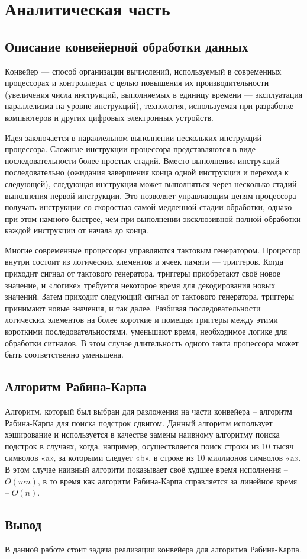\chapter{Аналитическая часть}

\section{Описание конвейерной обработки данных}

Конвейер — способ организации вычислений, используемый в современных процессорах и контроллерах с целью повышения их производительности (увеличения числа инструкций, выполняемых в единицу времени — эксплуатация параллелизма на уровне инструкций), технология, используемая при разработке компьютеров и других цифровых электронных устройств.

Идея заключается в параллельном выполнении нескольких инструкций процессора. Сложные инструкции процессора представляются в виде последовательности более простых стадий. Вместо выполнения инструкций последовательно (ожидания завершения конца одной инструкции и перехода к следующей), следующая инструкция может выполняться через несколько стадий выполнения первой инструкции. Это позволяет управляющим цепям процессора получать инструкции со скоростью самой медленной стадии обработки, однако при этом намного быстрее, чем при выполнении эксклюзивной полной обработки каждой инструкции от начала до конца.

Многие современные процессоры управляются тактовым генератором. Процессор внутри состоит из логических элементов и ячеек памяти — триггеров. Когда приходит сигнал от тактового генератора, триггеры приобретают своё новое значение, и «логике» требуется некоторое время для декодирования новых значений. Затем приходит следующий сигнал от тактового генератора, триггеры принимают новые значения, и так далее. Разбивая последовательности логических элементов на более короткие и помещая триггеры между этими короткими последовательностями, уменьшают время, необходимое логике для обработки сигналов. В этом случае длительность одного такта процессора может быть соответственно уменьшена.

\section{Алгоритм Рабина-Карпа}

Алгоритм, который был выбран для разложения на части конвейера -- алгоритм Рабина-Карпа\cite{rabink} для поиска подстрок сдвигом. Данный алгоритм использует хэширование и используется в качестве замены наивному алгоритму поиска подстрок в случаях, когда, например, осуществляется поиск строки из 10 тысяч символов «a», за которыми следует «b», в строке из 10 миллионов символов «a». В этом случае наивный алгоритм показывает своё худшее время исполнения -- $O(mn)$, в то время как алгоритм Рабина-Карпа справляется за линейное время -- $O(n)$.

\section*{Вывод}
В данной работе стоит задача реализации конвейера для алгоритма Рабина-Карпа.
